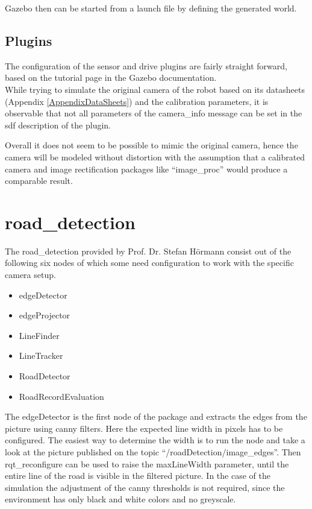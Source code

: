 Gazebo then can be started from a launch file by defining the generated world.\\

\subsection{Plugins}
The configuration of the sensor and drive plugins are fairly straight forward, based on the tutorial page in the Gazebo documentation\cite{gazebotutorial}.\\



While trying to simulate the original camera of the robot based on its datasheets (Appendix \ref{AppendixDataSheets}) and the calibration parameters, it is observable that not all parameters of the camera\_info message can be set in the sdf description of the plugin.

Overall it does not seem to be possible to mimic the original camera, hence the camera will be modeled without distortion with the assumption that a calibrated camera and image rectification packages like ``image\_proc'' would produce a comparable result.






\section{road\_detection}
The road\_detection provided by Prof. Dr. Stefan Hörmann consist out of the following six nodes of which some need configuration to work with the specific camera setup.

\begin{itemize}
	\item edgeDetector
	\item edgeProjector
	\item LineFinder
	\item LineTracker
	\item RoadDetector
	\item RoadRecordEvaluation
\end{itemize}

The edgeDetector is the first node of the package and extracts the edges from the picture using canny filters. Here the expected line width in pixels has to be configured. The easiest way to determine the width is to run the node and take a look at the picture published on the topic ``/roadDetection/image\_edges''. Then rqt\_reconfigure can be used to raise the maxLineWidth parameter, until the entire line of the road is visible in the filtered picture. In the case of the simulation the adjustment of the canny thresholds is not required, since the environment has only black and white colors and no greyscale.\\

